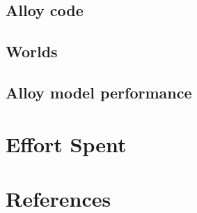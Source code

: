  \section{Alloy code}
  
  \section{Worlds}
  
  \section{Alloy model performance}
  

  \chapter{Effort Spent}
  
  

  \chapter{References}
  
  
  

  \setupspellchecking[state=start]